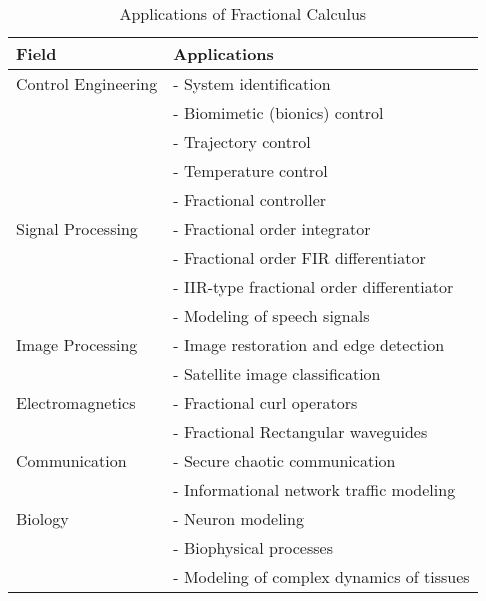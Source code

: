 \documentclass {llncs}
\begin{document}
\begin{table}
\begin{center} \label{tab:applications}
     \begin{tabular}{ | l | p{7cm} |}
     \hline
     \textbf{Field } & \textbf{Applications}  \\ \hline\hline
     Control Engineering   & - System identification \cite{sysid_99}\\
                           & - Biomimetic (bionics) control \cite{biom_04} \\
                           & - Trajectory control \cite{tr_2002}\\
                           & - Temperature control \cite{tmp_02}\\
                           & - Fractional  controller \cite{pi_07}  \\ \hline
     Signal Processing  &  - Fractional order integrator   \cite{dspdiffint_08} \\
                        &  - Fractional order FIR differentiator \cite{fracFIR_01}\\
                        &  - IIR-type fractional order differentiator \cite{fracIIR_03} \\
                        &  - Modeling of speech signals \cite{speech_07}\\\hline
     Image Processing   & - Image restoration and edge detection \cite{image_03} \\
                        & - Satellite image classification \cite{sattliteimage_03} \\ \hline
     Electromagnetics   & - Fractional curl operators \cite{Engheta_98,Naqvi_04}\\
                        & - Fractional Rectangular waveguides \cite{faryad_07}\\ \hline
     Communication   & - Secure chaotic communication \cite{chaotic_09} \\
                     & - Informational network traffic modeling \cite{informational_01}\\ \hline
     Biology   & - Neuron modeling \cite{neuro_94}\\
               & - Biophysical processes \cite{biophy_09} \\
               & - Modeling of complex dynamics of tissues \cite{tissue_10} \\
               \hline\hline

 \end{tabular}
  \end{center}
  \caption{Applications of Fractional Calculus}
\end{table}
\end{document}
